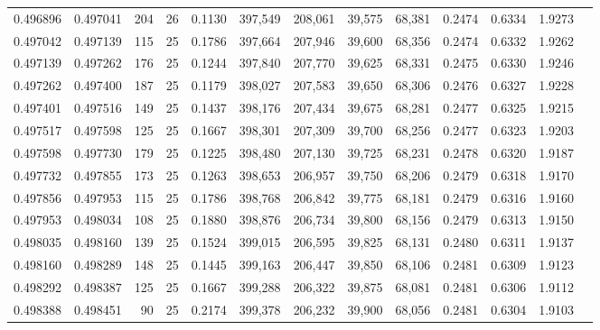 \begin{tabular}{rrrrrrrrrrrrr}
0.496896 & 0.497041 &   204 &  26 &                                     0.1130 & 397,549 & 208,061 &  39,575 &  68,381 & 0.2474 & 0.6334 & 1.9273 \\
0.497042 & 0.497139 &   115 &  25 &                                     0.1786 & 397,664 & 207,946 &  39,600 &  68,356 & 0.2474 & 0.6332 & 1.9262 \\
0.497139 & 0.497262 &   176 &  25 &                                     0.1244 & 397,840 & 207,770 &  39,625 &  68,331 & 0.2475 & 0.6330 & 1.9246 \\
0.497262 & 0.497400 &   187 &  25 &                                     0.1179 & 398,027 & 207,583 &  39,650 &  68,306 & 0.2476 & 0.6327 & 1.9228 \\
0.497401 & 0.497516 &   149 &  25 &                                     0.1437 & 398,176 & 207,434 &  39,675 &  68,281 & 0.2477 & 0.6325 & 1.9215 \\
0.497517 & 0.497598 &   125 &  25 &                                     0.1667 & 398,301 & 207,309 &  39,700 &  68,256 & 0.2477 & 0.6323 & 1.9203 \\
0.497598 & 0.497730 &   179 &  25 &                                     0.1225 & 398,480 & 207,130 &  39,725 &  68,231 & 0.2478 & 0.6320 & 1.9187 \\
0.497732 & 0.497855 &   173 &  25 &                                     0.1263 & 398,653 & 206,957 &  39,750 &  68,206 & 0.2479 & 0.6318 & 1.9170 \\
0.497856 & 0.497953 &   115 &  25 &                                     0.1786 & 398,768 & 206,842 &  39,775 &  68,181 & 0.2479 & 0.6316 & 1.9160 \\
0.497953 & 0.498034 &   108 &  25 &                                     0.1880 & 398,876 & 206,734 &  39,800 &  68,156 & 0.2479 & 0.6313 & 1.9150 \\
0.498035 & 0.498160 &   139 &  25 &                                     0.1524 & 399,015 & 206,595 &  39,825 &  68,131 & 0.2480 & 0.6311 & 1.9137 \\
0.498160 & 0.498289 &   148 &  25 &                                     0.1445 & 399,163 & 206,447 &  39,850 &  68,106 & 0.2481 & 0.6309 & 1.9123 \\
0.498292 & 0.498387 &   125 &  25 &                                     0.1667 & 399,288 & 206,322 &  39,875 &  68,081 & 0.2481 & 0.6306 & 1.9112 \\
0.498388 & 0.498451 &    90 &  25 &                                     0.2174 & 399,378 & 206,232 &  39,900 &  68,056 & 0.2481 & 0.6304 & 1.9103 \\

\end{tabular}
